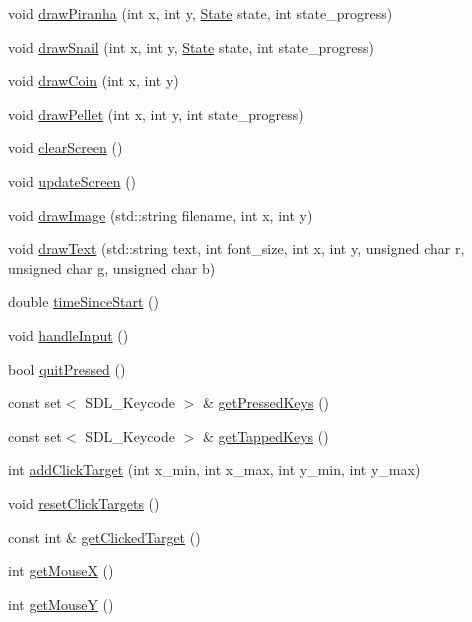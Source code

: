 \begin{DoxyCompactItemize}
\item 
void \mbox{\hyperlink{class_graphics_a2b8425428b81e566f960928fa42133b6}{draw\+Piranha}} (int x, int y, \mbox{\hyperlink{_constants_8hpp_a5d74787dedbc4e11c1ab15bf487e61f8}{State}} state, int state\+\_\+progress)
\item 
void \mbox{\hyperlink{class_graphics_afce4453a05a511f4f07164d91c4ee2bf}{draw\+Snail}} (int x, int y, \mbox{\hyperlink{_constants_8hpp_a5d74787dedbc4e11c1ab15bf487e61f8}{State}} state, int state\+\_\+progress)
\item 
void \mbox{\hyperlink{class_graphics_a62b98d9f52ad55e9bd8617130cfbf37b}{draw\+Coin}} (int x, int y)
\item 
void \mbox{\hyperlink{class_graphics_a63bc7bf1f68cfc785f08b6863d3034d2}{draw\+Pellet}} (int x, int y, int state\+\_\+progress)
\item 
void \mbox{\hyperlink{class_graphics_a68beb512b0697952ebafce249c86dbd3}{clear\+Screen}} ()
\item 
void \mbox{\hyperlink{class_graphics_a3621b0f55951fb891a5ac2ad7dd403a0}{update\+Screen}} ()
\item 
void \mbox{\hyperlink{class_graphics_afe0ce82b917ad83b8eaec222810f1efd}{draw\+Image}} (std\+::string filename, int x, int y)
\item 
void \mbox{\hyperlink{class_graphics_a3b78a92ad6cd4daaa44291df5c5c3e55}{draw\+Text}} (std\+::string text, int font\+\_\+size, int x, int y, unsigned char r, unsigned char g, unsigned char b)
\item 
double \mbox{\hyperlink{class_graphics_a35b4a23e0938ba205ce2a73ee7df5ea0}{time\+Since\+Start}} ()
\item 
void \mbox{\hyperlink{class_graphics_adff993cdcd0ed498c82cf7be87ead4f1}{handle\+Input}} ()
\item 
bool \mbox{\hyperlink{class_graphics_ad6339f656cf977c3a0cdd8688c672125}{quit\+Pressed}} ()
\item 
const set$<$ S\+D\+L\+\_\+\+Keycode $>$ \& \mbox{\hyperlink{class_graphics_a772ed930cc5ae22dcdc35b4094bffbce}{get\+Pressed\+Keys}} ()
\item 
const set$<$ S\+D\+L\+\_\+\+Keycode $>$ \& \mbox{\hyperlink{class_graphics_a0444c93625b87614ed8a742d8833e5ad}{get\+Tapped\+Keys}} ()
\item 
int \mbox{\hyperlink{class_graphics_acf2ad5a746e2cdb9c16dd742b1455603}{add\+Click\+Target}} (int x\+\_\+min, int x\+\_\+max, int y\+\_\+min, int y\+\_\+max)
\item 
void \mbox{\hyperlink{class_graphics_aedd2af95b26f8b2077e266f692818ea2}{reset\+Click\+Targets}} ()
\item 
const int \& \mbox{\hyperlink{class_graphics_ad622b701dc7888a814fbd934a766c457}{get\+Clicked\+Target}} ()
\item 
int \mbox{\hyperlink{class_graphics_a48c86f4a3a87446fd8df707899e92d4f}{get\+MouseX}} ()
\item 
int \mbox{\hyperlink{class_graphics_a4e21e1cfcd4523e86ddbc9c5d246de1e}{get\+MouseY}} ()
\end{DoxyCompactItemize}


